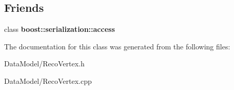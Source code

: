 \subsection*{Friends}
\begin{DoxyCompactItemize}
\item 
\hypertarget{classRecoVertex_ac98d07dd8f7b70e16ccb9a01abf56b9c}{class {\bfseries boost\-::serialization\-::access}}\label{classRecoVertex_ac98d07dd8f7b70e16ccb9a01abf56b9c}

\end{DoxyCompactItemize}


The documentation for this class was generated from the following files\-:\begin{DoxyCompactItemize}
\item 
Data\-Model/Reco\-Vertex.\-h\item 
Data\-Model/Reco\-Vertex.\-cpp\end{DoxyCompactItemize}
